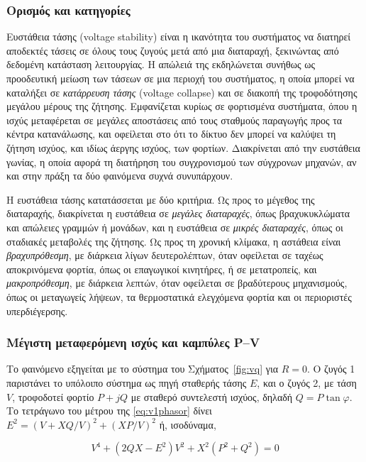 \subsubsection{Ορισμός και κατηγορίες}

Ευστάθεια τάσης (voltage stability) είναι η ικανότητα του συστήματος να διατηρεί αποδεκτές
τάσεις σε όλους τους ζυγούς μετά από μια διαταραχή, ξεκινώντας από δεδομένη κατάσταση
λειτουργίας. Η απώλειά της εκδηλώνεται συνήθως ως προοδευτική μείωση των τάσεων σε μια περιοχή
του συστήματος, η οποία μπορεί να καταλήξει σε \emph{κατάρρευση τάσης} (voltage collapse) και
σε διακοπή της τροφοδότησης μεγάλου μέρους της ζήτησης. Εμφανίζεται κυρίως σε φορτισμένα
συστήματα, όπου η ισχύς μεταφέρεται σε μεγάλες αποστάσεις από τους σταθμούς παραγωγής προς τα
κέντρα κατανάλωσης, και οφείλεται στο ότι το δίκτυο δεν μπορεί να καλύψει τη ζήτηση ισχύος, και
ιδίως άεργης ισχύος, των φορτίων. Διακρίνεται από την ευστάθεια γωνίας, η οποία αφορά τη
διατήρηση του συγχρονισμού των σύγχρονων μηχανών, αν και στην πράξη τα δύο φαινόμενα συχνά
συνυπάρχουν.

Η ευστάθεια τάσης κατατάσσεται με δύο κριτήρια. Ως προς το μέγεθος της διαταραχής, διακρίνεται
η ευστάθεια σε \emph{μεγάλες διαταραχές}, όπως βραχυκυκλώματα και απώλειες γραμμών ή μονάδων,
και η ευστάθεια σε \emph{μικρές διαταραχές}, όπως οι σταδιακές μεταβολές της ζήτησης. Ως προς
τη χρονική κλίμακα, η αστάθεια είναι \emph{βραχυπρόθεσμη}, με διάρκεια λίγων δευτερολέπτων,
όταν οφείλεται σε ταχέως αποκρινόμενα φορτία, όπως οι επαγωγικοί κινητήρες, ή σε μετατροπείς,
και \emph{μακροπρόθεσμη}, με διάρκεια λεπτών, όταν οφείλεται σε βραδύτερους μηχανισμούς, όπως
οι μεταγωγείς λήψεων, τα θερμοστατικά ελεγχόμενα φορτία και οι περιοριστές υπερδιέγερσης.

\subsubsection{Μέγιστη μεταφερόμενη ισχύς και καμπύλες P--V}

Το φαινόμενο εξηγείται με το σύστημα του Σχήματος~\ref{fig:vq} για $R = 0$. Ο ζυγός 1
παριστάνει το υπόλοιπο σύστημα ως πηγή σταθερής τάσης $E$, και ο ζυγός 2, με τάση $V$,
τροφοδοτεί φορτίο $P + jQ$ με σταθερό συντελεστή ισχύος, δηλαδή $Q = P\tan\varphi$. Το
τετράγωνο του μέτρου της \eqref{eq:v1phasor} δίνει $E^2 = (V + XQ/V)^2 + (XP/V)^2$ ή,
ισοδύναμα,

\begin{equation}
V^4 + \left(2QX - E^2\right) V^2 + X^2\left(P^2 + Q^2\right) = 0
\label{eq:pv}
\end{equation}

